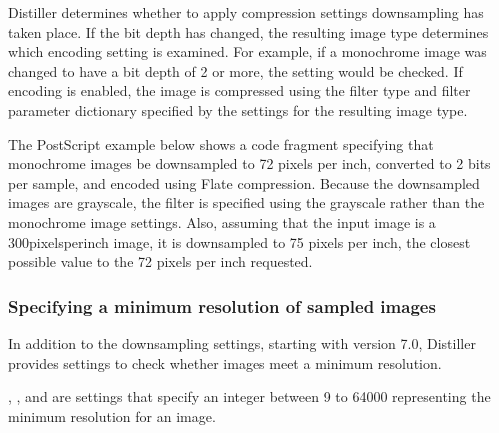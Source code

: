 \documentclass[letterpaper,12pt,english,openany,oneside]{sphinxmanual}
\begin{document}
Distiller determines whether to apply compression settings  downsampling has taken place. If the bit depth has changed, the resulting image type determines which encoding setting is examined. For example, if a monochrome image was changed to have a bit depth of 2 or more, the  setting would be checked. If encoding is enabled, the image is compressed using the filter type and filter parameter dictionary specified by the settings for the resulting image type.

The PostScript example below shows a code fragment specifying that monochrome images be downsampled to 72 pixels per inch, converted to 2 bits per sample, and encoded using Flate compression. Because the downsampled images are grayscale, the filter is specified using the grayscale rather than the monochrome image settings. Also, assuming that the input image is a 300\sphinxhyphen{}pixels\sphinxhyphen{}per\sphinxhyphen{}inch image, it is downsampled to 75 pixels per inch, the closest possible value to the 72 pixels per inch requested.

\begin{sphinxVerbatim}[commandchars=\\\{\}]
     
       
       
       
       
       
 
\end{sphinxVerbatim}




\subsubsection{Specifying a minimum resolution of sampled images}
\label{\detokenize{PDF_Create_UsingSettings:specifying-a-minimum-resolution-of-sampled-images}}
In addition to the downsampling settings, starting with version 7.0, Distiller provides settings to check whether images meet a minimum resolution.

 ,  , and  are settings that specify an integer between 9 to 64000 representing the minimum resolution for an image.
\end{document}
